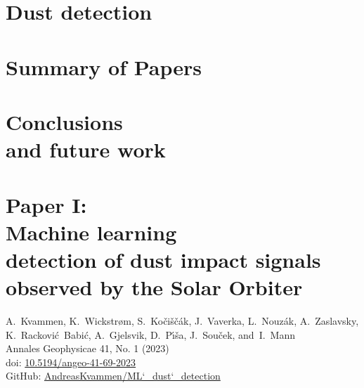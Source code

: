\documentclass[11pt,twoside,openright]{book}
\begin{document}
\chapter{Dust detection}\label{ch:detection}


\chapter{Summary of Papers}\label{ch:sum-paper}


\chapter[Conclusions and future work]{Conclusions\\and future work}\label{ch:conclusion}





\backmatter

\printbibliography

% 



\chapter[Paper I: Machine learning detection of dust impact signals observed by the Solar Orbiter]{Paper I:\\Machine learning\\detection of dust impact signals\\observed by the Solar Orbiter}
A.~Kvammen, K.~Wickstr{\o}m, S.~Ko{\v{c}}i{\v{s}}{\v{c}}{\'a}k, J.~Vaverka, L.~Nouz{\'a}k, A.~Zaslavsky, K.~Rackovi{\'c}~Babi{\'c}, A.~Gjelsvik, D.~P{\'\i}{\v{s}}a, J.~Sou{\v{c}}ek, and~I.~Mann\\
Annales Geophysicae 41, No. 1 (2023)\\
doi: \href{https://doi.org/10.5194/angeo-41-69-2023}{10.5194/angeo-41-69-2023}\\
GitHub: \href{https://zenodo.org/records/7404457}{AndreasKvammen/ML\char`_dust\char`_detection}\\
\newpage\null\newpage

\end{document}
